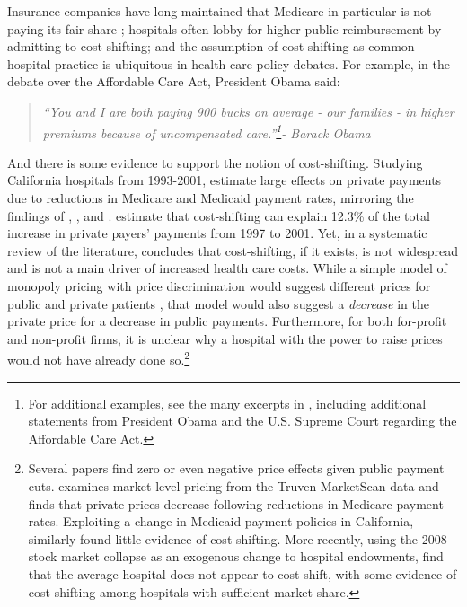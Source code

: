 \documentclass[12pt]{article}
\begin{document}
Insurance companies have long maintained that Medicare in particular is not paying its fair share \citep{frakt2011}; hospitals often lobby for higher public reimbursement by admitting to cost-shifting;  and the assumption of cost-shifting as common hospital practice is ubiquitous in health care policy debates. For example, in the debate over the Affordable Care Act, President Obama said:
\begin{quote}
\textit{``You and I are both paying 900 bucks on average - our families - in higher premiums because of uncompensated care.''\footnote{For additional examples, see the many excerpts in \cite{dranove2017}, including additional statements from President Obama and the U.S. Supreme Court regarding the Affordable Care Act.}- Barack Obama}
\end{quote}
And there is some evidence to support the notion of cost-shifting. Studying California hospitals from 1993-2001, \cite{zwanziger2006} estimate large effects on private payments due to reductions in Medicare and Medicaid payment rates, mirroring the findings of \cite{lee2003}, \cite{zwanziger2000}, and \cite{cutler1998costshift}. \cite{zwanziger2006} estimate that cost-shifting can explain 12.3\% of the total increase in private payers' payments from 1997 to 2001.  Yet, in a systematic review of the literature, \citet{frakt2011} concludes that cost-shifting, if it exists, is not widespread and is not a main driver of increased health care costs.   While a simple model of monopoly pricing with price discrimination would suggest different prices for public and private patients \citep{hay1983}, that model would also suggest a \textit{decrease} in the private price for a decrease in public payments.  Furthermore, for both for-profit and non-profit firms, it is unclear why a hospital with the power to raise prices would not have already done so.\footnote{Several papers find zero or even negative price effects given public payment cuts. \cite{white2013} examines market level pricing from the Truven MarketScan data and finds that private prices decrease following reductions in Medicare payment rates. Exploiting a change in Medicaid payment policies in California, \citet{dranove1998} similarly found little evidence of cost-shifting. More recently, using the 2008 stock market collapse as an exogenous change to hospital endowments, \cite{dranove2017} find that the average hospital does not appear to cost-shift, with some evidence of cost-shifting among hospitals with sufficient market share.}
\end{document}
